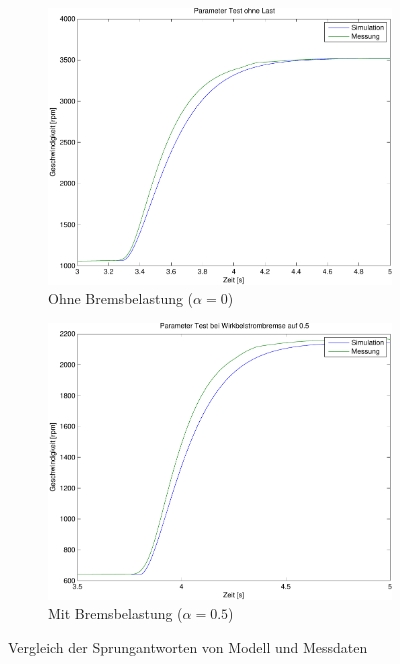 \begin{figure}[h!]
	\centering
	\begin{subfigure}{0.475\textwidth}
		\includegraphics[width=1\textwidth]{07/parameter_test_noload.pdf}
		\caption{Ohne Bremsbelastung ($\alpha = 0$)}
	\end{subfigure}
	\begin{subfigure}{0.475\textwidth}
		\includegraphics[width=1\textwidth]{07/parameter_test_load.pdf}
		\caption{Mit Bremsbelastung ($\alpha = 0.5$)}
	\end{subfigure}
	\caption{Vergleich der Sprungantworten von Modell und Messdaten}
\end{figure}

